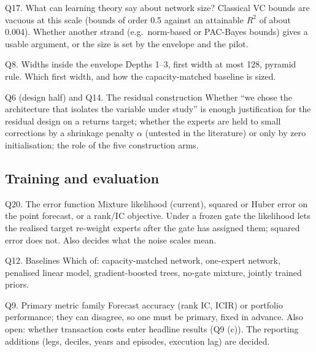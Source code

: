 \begin{openbox}{Q17. What can learning theory say about network size?}
Classical VC bounds are vacuous at this scale (bounds of order 0.5 against an attainable $R^2$ of about
0.004). Whether another strand (e.g.\ norm-based or PAC-Bayes bounds) gives a usable argument, or the
size is set by the envelope and the pilot.
\end{openbox}

\begin{openbox}{Q8. Widths inside the envelope}
Depths 1--3, first width at most 128, pyramid rule. Which first width, and how the capacity-matched
baseline is sized.
\end{openbox}

\begin{openbox}{Q6 (design half) and Q14. The residual construction}
Whether ``we chose the architecture that isolates the variable under study'' is enough justification
for the residual design on a returns target; whether the experts are held to small corrections by a
shrinkage penalty $\alpha$ (untested in the literature) or only by zero initialisation; the role of the
five construction arms.
\end{openbox}

\subsection{Training and evaluation}

\begin{openbox}{Q20. The error function}
Mixture likelihood (current), squared or Huber error on the point forecast, or a rank/IC objective.
Under a frozen gate the likelihood lets the realised target re-weight experts after the gate has
assigned them; squared error does not. Also decides what the noise scales mean.
\end{openbox}

\begin{openbox}{Q12. Baselines}
Which of: capacity-matched network, one-expert network, penalised linear model, gradient-boosted trees,
no-gate mixture, jointly trained priors.
\end{openbox}

\begin{openbox}{Q9. Primary metric family}
Forecast accuracy (rank IC, ICIR) or portfolio performance; they can disagree, so one must be primary,
fixed in advance. Also open: whether transaction costs enter headline results (Q9 (c)). The reporting additions
(legs, deciles, years and episodes, execution lag) are decided.
\end{openbox}


